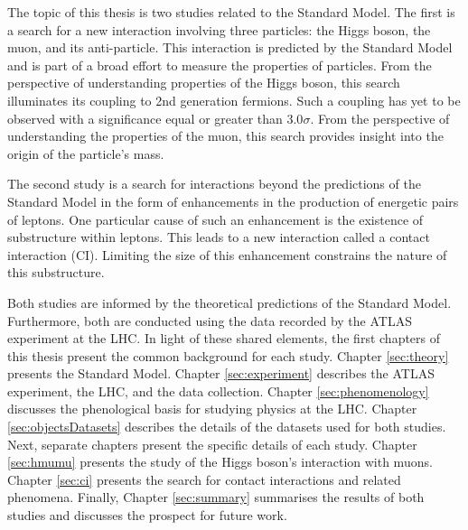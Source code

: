 The topic of this thesis is two studies related to the Standard Model.
The first is a search for a new interaction involving three particles: the Higgs boson, the muon, and its anti-particle.
This interaction is predicted by the Standard Model and is part of a broad effort to measure the properties of particles.
From the perspective of understanding properties of the Higgs boson, this search illuminates its coupling to 2nd generation fermions.
Such a coupling has yet to be observed with a significance equal or greater than 3.0$\sigma$.
From the perspective of understanding the properties of the muon, this search provides insight into the origin of the particle's mass.

The second study is a search for interactions beyond the predictions of the Standard Model in the form of enhancements in the production of energetic pairs of leptons.
One particular cause of such an enhancement is the existence of substructure within leptons. 
This leads to a new interaction called a contact interaction (CI).
Limiting the size of this enhancement constrains the nature of this substructure.

Both studies are informed by the theoretical predictions of the Standard Model.
Furthermore, both are conducted using the data recorded by the ATLAS experiment at the LHC.
In light of these shared elements, the first chapters of this thesis present the common background for each study.
Chapter \ref{sec:theory} presents the Standard Model.
Chapter \ref{sec:experiment} describes the ATLAS experiment, the LHC, and the data collection.
Chapter \ref{sec:phenomenology} discusses the phenological basis for studying physics at the LHC.
Chapter \ref{sec:objectsDatasets} describes the details of the datasets used for both studies.
Next, separate chapters present the specific details of each study.
Chapter \ref{sec:hmumu} presents the study of the Higgs boson's interaction with muons.
Chapter \ref{sec:ci} presents the search for contact interactions and related phenomena.
Finally, Chapter \ref{sec:summary} summarises the results of both studies and discusses the prospect for future work.

